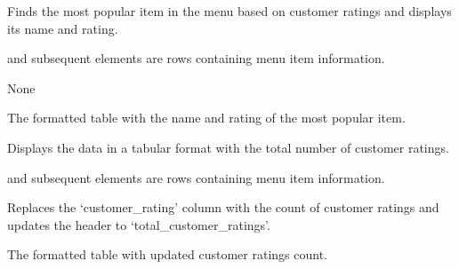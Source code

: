 \documentclass[letterpaper,10pt,english]{sphinxmanual}
\begin{document}
\begin{fulllineitems}
\label{\detokenize{main:main.get_most_popular_item}}
\pysigstartsignatures
{}
\pysigstopsignatures
\sphinxAtStartPar
Finds the most popular item in the menu based on customer ratings and displays its name and rating.
\begin{description}
\begin{description}
\sphinxAtStartPar
and subsequent elements are rows containing menu item information.

\end{description}

\sphinxAtStartPar
None

\sphinxAtStartPar
The formatted table with the name and rating of the most popular item.

\end{description}

\end{fulllineitems}


\begin{fulllineitems}
\label{\detokenize{main:main.show_data}}
\pysigstartsignatures
{}
\pysigstopsignatures
\sphinxAtStartPar
Displays the data in a tabular format with the total number of customer ratings.
\begin{description}
\begin{description}
\sphinxAtStartPar
and subsequent elements are rows containing menu item information.

\end{description}

\sphinxAtStartPar
Replaces the ‘customer\_rating’ column with the count of customer ratings 
and updates the header to ‘total\_customer\_ratings’.

\sphinxAtStartPar
The formatted table with updated customer ratings count.

\end{description}

\end{fulllineitems}
\end{document}
